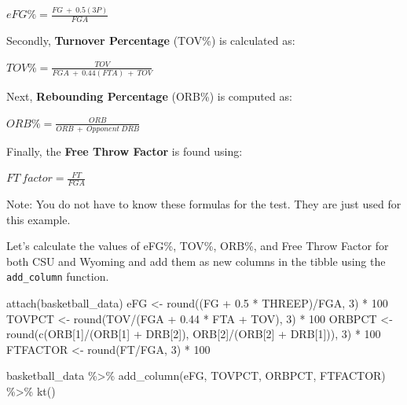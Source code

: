 \documentclass[
  11pt,
]{book}
\newenvironment{Shaded}{\begin{snugshade}}{\end{snugshade}}
\newcommand{\DecValTok}[1]{\textcolor[rgb]{0.00,0.00,0.81}{#1}}
\newcommand{\FloatTok}[1]{\textcolor[rgb]{0.00,0.00,0.81}{#1}}
\newcommand{\FunctionTok}[1]{\textcolor[rgb]{0.00,0.00,0.00}{#1}}
\newcommand{\NormalTok}[1]{#1}
\newcommand{\OtherTok}[1]{\textcolor[rgb]{0.56,0.35,0.01}{#1}}
\newcommand{\SpecialCharTok}[1]{\textcolor[rgb]{0.00,0.00,0.00}{#1}}
\theoremstyle{definition}
\theoremstyle{definition}
\theoremstyle{definition}
\theoremstyle{definition}
\theoremstyle{remark}
\begin{document}
\(eFG\% = \frac{FG\ +\ 0.5(3P)}{FGA}\)

Secondly, \textbf{Turnover Percentage} (TOV\%) is calculated as:

\(TOV\% = \frac{TOV}{FGA\ +\ 0.44(FTA)\ +\ TOV}\)

Next, \textbf{Rebounding Percentage} (ORB\%) is computed as:

\(ORB\% = \frac{ORB}{ORB\ +\ Opponent\ DRB}\)

Finally, the \textbf{Free Throw Factor} is found using:

\(FT\ factor = \frac{FT}{FGA}\)

Note: You do not have to know these formulas for the test. They are just used for this example.

Let's calculate the values of eFG\%, TOV\%, ORB\%, and Free Throw Factor for both CSU and Wyoming and add them as new columns in the tibble using the \texttt{add\_column} function.

\begin{Shaded}
\begin{Highlighting}[]
\FunctionTok{attach}\NormalTok{(basketball\_data)}
\NormalTok{eFG }\OtherTok{\textless{}{-}} \FunctionTok{round}\NormalTok{((FG }\SpecialCharTok{+} \FloatTok{0.5} \SpecialCharTok{*}\NormalTok{ THREEP)}\SpecialCharTok{/}\NormalTok{FGA, }\DecValTok{3}\NormalTok{) }\SpecialCharTok{*} \DecValTok{100}
\NormalTok{TOVPCT }\OtherTok{\textless{}{-}} \FunctionTok{round}\NormalTok{(TOV}\SpecialCharTok{/}\NormalTok{(FGA }\SpecialCharTok{+} \FloatTok{0.44} \SpecialCharTok{*}\NormalTok{ FTA }\SpecialCharTok{+}\NormalTok{ TOV), }\DecValTok{3}\NormalTok{) }\SpecialCharTok{*} \DecValTok{100}
\NormalTok{ORBPCT }\OtherTok{\textless{}{-}} \FunctionTok{round}\NormalTok{(}\FunctionTok{c}\NormalTok{(ORB[}\DecValTok{1}\NormalTok{]}\SpecialCharTok{/}\NormalTok{(ORB[}\DecValTok{1}\NormalTok{] }\SpecialCharTok{+}\NormalTok{ DRB[}\DecValTok{2}\NormalTok{]), ORB[}\DecValTok{2}\NormalTok{]}\SpecialCharTok{/}\NormalTok{(ORB[}\DecValTok{2}\NormalTok{] }\SpecialCharTok{+}\NormalTok{ DRB[}\DecValTok{1}\NormalTok{])), }\DecValTok{3}\NormalTok{) }\SpecialCharTok{*} \DecValTok{100}
\NormalTok{FTFACTOR }\OtherTok{\textless{}{-}} \FunctionTok{round}\NormalTok{(FT}\SpecialCharTok{/}\NormalTok{FGA, }\DecValTok{3}\NormalTok{) }\SpecialCharTok{*} \DecValTok{100}

\NormalTok{basketball\_data }\SpecialCharTok{\%\textgreater{}\%}
    \FunctionTok{add\_column}\NormalTok{(eFG, TOVPCT, ORBPCT, FTFACTOR) }\SpecialCharTok{\%\textgreater{}\%}
    \FunctionTok{kt}\NormalTok{()}
\end{Highlighting}
\end{Shaded}
\end{document}
